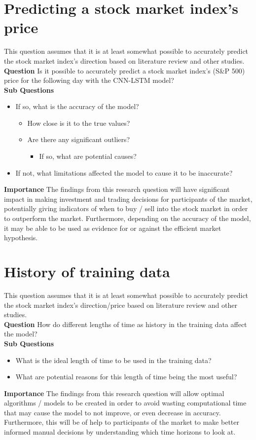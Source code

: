 \section{Predicting a stock market index's price}
This question assumes that it is at least somewhat possible to accurately predict the stock market index's
direction based on literature review and other studies.\\
\textbf{Question} Is it possible to accurately predict a stock market index's (S\&P 500) price for
the following day with the CNN-LSTM model?\\
\textbf{Sub Questions}
\begin{itemize}
    \item If so, what is the accuracy of the model?
    \begin{itemize}
        \item How close is it to the true values?
        \item Are there any significant outliers?
        \begin{itemize}
            \item If so, what are potential causes?
        \end{itemize}
    \end{itemize}
    \item If not, what limitations affected the model to cause it to be inaccurate?
\end{itemize}
\textbf{Importance} The findings from this research question will have significant impact in making
investment and trading decisions for participants of the market, potentially giving indicators of
when to buy / sell into the stock market in order to outperform the market. Furthermore, depending
on the accuracy of the model, it may be able to be used as evidence for or against the efficient
market hypothesis.

\section{History of training data}
This question assumes that it is at least somewhat possible to accurately predict the stock market index's
direction/price based on literature review and other studies.\\
\textbf{Question} How do different lengths of time as history in the training data affect the model?\\
\textbf{Sub Questions}
\begin{itemize}
    \item What is the ideal length of time to be used in the training data?
    \item What are potential reasons for this length of time being the most useful?
\end{itemize}
\textbf{Importance} The findings from this research question will allow optimal algorithms /
models to be created in order to avoid wasting computational time that may cause the model to 
not improve, or even decrease in accuracy. Furthermore, this will be of help to participants of
the market to make better informed manual decisions by understanding which time horizons to look
at.

